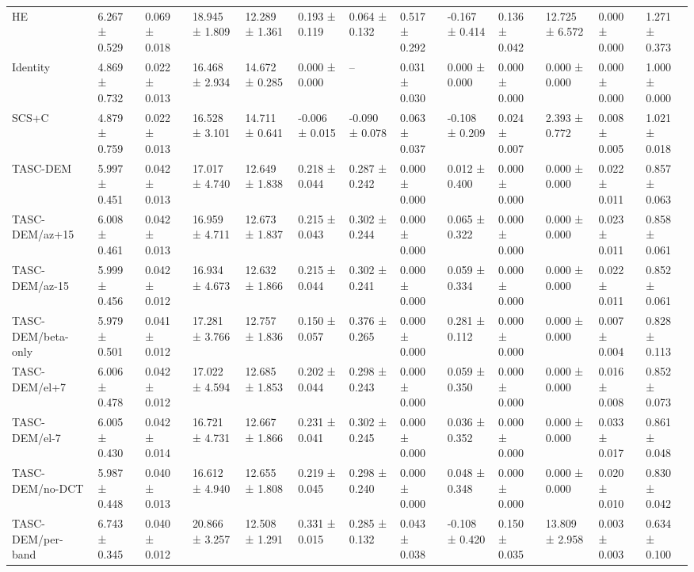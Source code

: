 \begin{table}[t]
\begin{tabular}{lllllllllllll}
HE & 6.267 ± 0.529 & 0.069 ± 0.018 & 18.945 ± 1.809 & 12.289 ± 1.361 & 0.193 ± 0.119 & 0.064 ± 0.132 & 0.517 ± 0.292 & -0.167 ± 0.414 & 0.136 ± 0.042 & 12.725 ± 6.572 & 0.000 ± 0.000 & 1.271 ± 0.373 \\
Identity & 4.869 ± 0.732 & 0.022 ± 0.013 & 16.468 ± 2.934 & 14.672 ± 0.285 & 0.000 ± 0.000 & -- & 0.031 ± 0.030 & 0.000 ± 0.000 & 0.000 ± 0.000 & 0.000 ± 0.000 & 0.000 ± 0.000 & 1.000 ± 0.000 \\
SCS+C & 4.879 ± 0.759 & 0.022 ± 0.013 & 16.528 ± 3.101 & 14.711 ± 0.641 & -0.006 ± 0.015 & -0.090 ± 0.078 & 0.063 ± 0.037 & -0.108 ± 0.209 & 0.024 ± 0.007 & 2.393 ± 0.772 & 0.008 ± 0.005 & 1.021 ± 0.018 \\
TASC-DEM & 5.997 ± 0.451 & 0.042 ± 0.013 & 17.017 ± 4.740 & 12.649 ± 1.838 & 0.218 ± 0.044 & 0.287 ± 0.242 & 0.000 ± 0.000 & 0.012 ± 0.400 & 0.000 ± 0.000 & 0.000 ± 0.000 & 0.022 ± 0.011 & 0.857 ± 0.063 \\
TASC-DEM/az+15 & 6.008 ± 0.461 & 0.042 ± 0.013 & 16.959 ± 4.711 & 12.673 ± 1.837 & 0.215 ± 0.043 & 0.302 ± 0.244 & 0.000 ± 0.000 & 0.065 ± 0.322 & 0.000 ± 0.000 & 0.000 ± 0.000 & 0.023 ± 0.011 & 0.858 ± 0.061 \\
TASC-DEM/az-15 & 5.999 ± 0.456 & 0.042 ± 0.012 & 16.934 ± 4.673 & 12.632 ± 1.866 & 0.215 ± 0.044 & 0.302 ± 0.241 & 0.000 ± 0.000 & 0.059 ± 0.334 & 0.000 ± 0.000 & 0.000 ± 0.000 & 0.022 ± 0.011 & 0.852 ± 0.061 \\
TASC-DEM/beta-only & 5.979 ± 0.501 & 0.041 ± 0.012 & 17.281 ± 3.766 & 12.757 ± 1.836 & 0.150 ± 0.057 & 0.376 ± 0.265 & 0.000 ± 0.000 & 0.281 ± 0.112 & 0.000 ± 0.000 & 0.000 ± 0.000 & 0.007 ± 0.004 & 0.828 ± 0.113 \\
TASC-DEM/el+7 & 6.006 ± 0.478 & 0.042 ± 0.012 & 17.022 ± 4.594 & 12.685 ± 1.853 & 0.202 ± 0.044 & 0.298 ± 0.243 & 0.000 ± 0.000 & 0.059 ± 0.350 & 0.000 ± 0.000 & 0.000 ± 0.000 & 0.016 ± 0.008 & 0.852 ± 0.073 \\
TASC-DEM/el-7 & 6.005 ± 0.430 & 0.042 ± 0.014 & 16.721 ± 4.731 & 12.667 ± 1.866 & 0.231 ± 0.041 & 0.302 ± 0.245 & 0.000 ± 0.000 & 0.036 ± 0.352 & 0.000 ± 0.000 & 0.000 ± 0.000 & 0.033 ± 0.017 & 0.861 ± 0.048 \\
TASC-DEM/no-DCT & 5.987 ± 0.448 & 0.040 ± 0.013 & 16.612 ± 4.940 & 12.655 ± 1.808 & 0.219 ± 0.045 & 0.298 ± 0.240 & 0.000 ± 0.000 & 0.048 ± 0.348 & 0.000 ± 0.000 & 0.000 ± 0.000 & 0.020 ± 0.010 & 0.830 ± 0.042 \\
TASC-DEM/per-band & 6.743 ± 0.345 & 0.040 ± 0.012 & 20.866 ± 3.257 & 12.508 ± 1.291 & 0.331 ± 0.015 & 0.285 ± 0.132 & 0.043 ± 0.038 & -0.108 ± 0.420 & 0.150 ± 0.035 & 13.809 ± 2.958 & 0.003 ± 0.003 & 0.634 ± 0.100 \\

\end{tabular}
\end{table}
